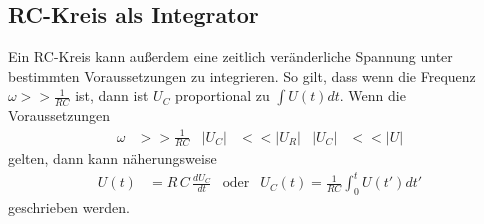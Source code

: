 \subsection{RC-Kreis als Integrator} %
\label{sub:Integrator4}
Ein RC-Kreis kann außerdem eine zeitlich veränderliche Spannung unter bestimmten Voraussetzungen zu integrieren.
So gilt, dass wenn die Frequenz $\omega >> \frac{1}{RC}$ ist, dann ist $U_C$ proportional zu $\int U(t)dt$.
Wenn die Voraussetzungen
\begin{align*}
    \omega&>>\frac{1}{RC}&\lvert U_C\rvert&<< \lvert U_R\rvert & \lvert U_C\rvert &<< \lvert U\rvert
\end{align*}
gelten, dann kann näherungsweise
\begin{align}
    U(t) &= R\,C \,\frac{dU_C}{dt} &\text{oder} & U_C(t) = \frac{1}{RC} \int^t_0 U(t') dt'
\end{align}
geschrieben werden.

